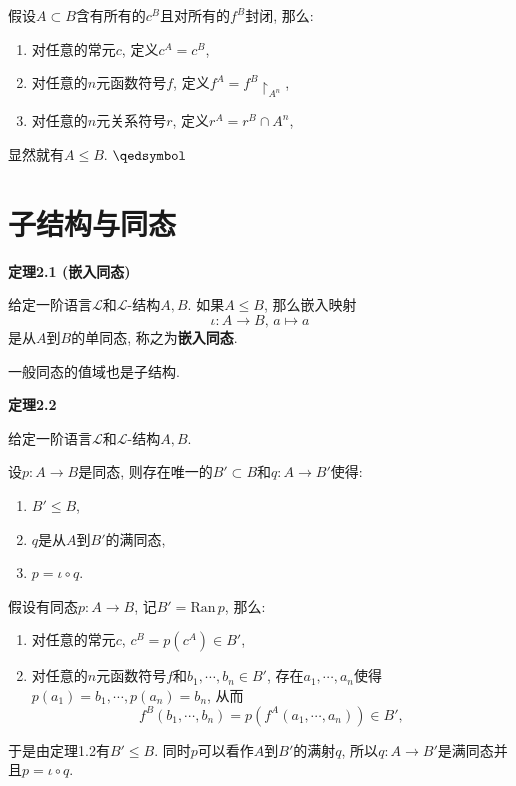 
假设$A\subset B$含有所有的$c^B$且对所有的$f^B$封闭, 那么:
\begin{enumerate}
    \item 对任意的常元$c$, 定义$c^A=c^B$,
    \item 对任意的$n$元函数符号$f$, 定义$f^A=f^B\!\restriction_{A^n}$,
    \item 对任意的$n$元关系符号$r$, 定义$r^A=r^B\cap A^n$,
\end{enumerate}
显然就有$A\leqslant B$. \hfill $\qedsymbol$





\newpage

\section{子结构与同态}

\hypertarget{sec:定理2.1}{}
\noindent\textbf{定理2.1 (嵌入同态)}

给定一阶语言$\mathcal{L}$和$\mathcal{L}$-结构$A,B$.
如果$A\leqslant B$, 那么嵌入映射
\[
    \iota:A\to B,\,a\mapsto a
\]
是从$A$到$B$的单同态, 称之为\textbf{嵌入同态}.

\vspace{10pt}

一般同态的值域也是子结构.

\vspace{10pt}

\hypertarget{sec:定理2.2}{}
\noindent\textbf{定理2.2}

给定一阶语言$\mathcal{L}$和$\mathcal{L}$-结构$A,B$.

设$p:A\to B$是同态, 则存在唯一的$B'\subset B$和$q:A\to B'$使得:
\begin{enumerate}
    \item $B'\leqslant B$,
    \item $q$是从$A$到$B'$的满同态,
    \item $p=\iota\circ q$.
\end{enumerate}



假设有同态$p:A\to B$, 记$B'=\mathrm{Ran}\,p$, 那么:
\begin{enumerate}
    \item 对任意的常元$c$, $c^{B}=p(c^A)\in B'$,
    \item 对任意的$n$元函数符号$f$和$b_1,\cdots,b_n\in B'$,
    存在$a_1,\cdots,a_n$使得$p(a_1)=b_1,\cdots,p(a_n)=b_n$, 从而
    \[
        f^B(b_1,\cdots,b_n)=p(f^A(a_1,\cdots,a_n))\in B',
    \]
\end{enumerate}
于是由定理1.2有$B'\leqslant B$.
同时$p$可以看作$A$到$B'$的满射$q$, 所以$q:A\to B'$是满同态并且$p=\iota\circ q$.

